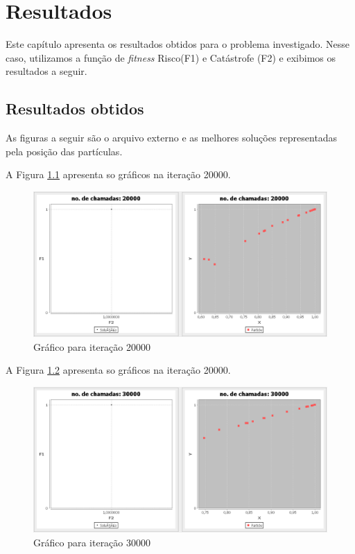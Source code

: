 \chapter{Resultados}
Este cap\'itulo apresenta os resultados obtidos para o problema investigado. Nesse caso, utilizamos a fun\c{c}\~ao de \textit{fitness} Risco(F1) e Cat\'astrofe (F2) e exibimos os resultados a seguir.

\section{Resultados obtidos}
As figuras a seguir s\~ao o arquivo externo e as melhores solu\c{c}\~oes representadas pela posi\c{c}\~ao das part\'iculas. 

A Figura \ref{fig:result1} apresenta so gr\'aficos na itera\c{c}\~ao 20000.
\begin{figure}[H]
	\centering
	\includegraphics[width=.6\textwidth]{img/result_mopso-cdr_20000_risk.png}
	\caption{Gr\'afico para itera\c{c}\~ao 20000}
	\label{fig:result1}
\end{figure}

A Figura \ref{fig:result2} apresenta so gr\'aficos na itera\c{c}\~ao 20000.
\begin{figure}[H]
	\centering
	\includegraphics[width=.6\textwidth]{img/result_mopso-cdr_30000_risk.png}
	\caption{Gr\'afico para itera\c{c}\~ao 30000}
	\label{fig:result2}
\end{figure}